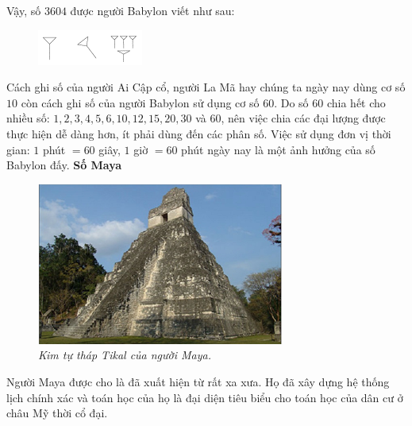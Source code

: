 \begin{multicols}{2}
\begin{figure}[H]
		\vspace*{-10pt}
	\end{figure}
	Vậy, số $3604$ được người Babylon viết như sau:
	\begin{figure}[H]
		\centering
		\captionsetup{labelformat= empty, justification=centering}
		\includegraphics[width=0.35\linewidth]{27}
		\vspace*{-10pt}
	\end{figure}
	Cách ghi số của người Ai Cập cổ, người La Mã hay chúng ta ngày nay dùng cơ số $10$ còn cách ghi số của người Babylon sử dụng cơ số $60$. Do số $60$ chia hết cho nhiều số: $1,2,3,4,5,6, 10, 12, 15, 20,30$ và $60$, nên việc chia các đại lượng được thực hiện dễ dàng hơn, ít phải dùng đến các phân số. Việc sử dụng đơn vị thời gian: $1$ phút $= 60$ giây, $1$ giờ $= 60$ phút ngày nay là một ảnh hưởng của số Babylon đấy.
	\vskip 0.1cm
	\textbf{\color{toancuabi}Số Maya}
	\vskip 0.1cm
	\begin{figure}[H]
		\centering
		\vspace*{-10pt}
		\captionsetup{labelformat= empty, justification=centering}
		\includegraphics[width=1\linewidth]{28}
		\caption{\textit{\color{toancuabi}Kim tự tháp Tikal của người Maya.}}
		\vspace*{-10pt}
	\end{figure}
	Người Maya  được cho là đã xuất hiện từ rất xa xưa. Họ đã xây dựng hệ thống lịch chính xác và toán học của họ là đại diện tiêu biểu cho toán học của dân cư ở châu Mỹ thời cổ đại.

\end{multicols}
